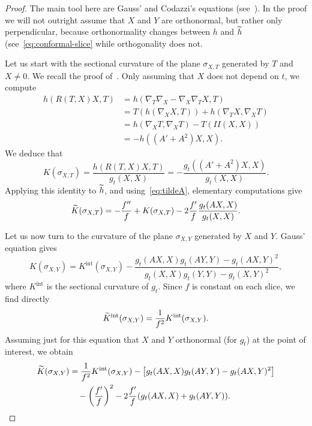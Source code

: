 \documentclass[10pt]{amsart}
\theoremstyle{definition}\newtheorem{defi}[theo]{Definition}\newtheorem{rema}[theo]{Remark}\newtheorem{exam}[theo]{Example}\newtheorem{exem}[theo]{Example}\newtheorem{nota}[theo]{Notation}
\DeclareMathOperator{\intt}{int}
\theoremstyle{plain}
\let\oldtilde\tilde
\renewcommand*{\tilde}[1]{\mathchoice{\widetilde{#1}}{\widetilde{#1}}{\oldtilde{#1}}{\oldtilde{#1}}}
\begin{document}
\begin{proof}
The main tool here are Gauss' and Codazzi's equations (see~\cite[Section~6.3]{DoCarmo}). In the proof we will not outright assume that $X$ and $Y$ are orthonormal, but rather only perpendicular, because orthonormality changes between $h$ and $\tilde{h}$ (see~\eqref{eq:conformal-slice} while orthogonality does not.

Let us start with the sectional curvature of the plane $\sigma_{X,T}$ generated by $T$ and $X\neq 0$. We recall the proof of~\cite[Eq.~2.7]{Chen-Erchenko-Gogolev}. Only assuming that $X$ does not depend on $t$, we compute
\begin{align*}
h(R(T,X)X, T) &= h(\nabla_T \nabla_X-\nabla_X \nabla_T X, T) \\
& = T(h(\nabla_X X,T)) + h(\nabla_T X, \nabla_X T) \\
& = h(\nabla_X T, \nabla_X T) - T(II(X,X)) \\
&= - h((A'+A^2)X,X).
\end{align*}
We deduce that
\[
K(\sigma_{X,T}) = \frac{h(R(T,X)X,T)}{g_t(X,X)}= - \frac{g_t((A'+A^2)X,X)}{g_t(X,X)}.
\]
Applying this identity to $\tilde{h}$, and using~\eqref{eq:tildeA}, elementary computations give
\[
\tilde{K}(\sigma_{X,T}) = - \frac{f''}{f} + K(\sigma_{X,T}) - 2 \frac{f'}{f} \frac{g_t(AX,X)}{g_t(X,X)}.
\]


Let us now turn to the curvature of the plane $\sigma_{X,Y}$ generated by $X$ and $Y$. Gauss' equation gives
\[
K(\sigma_{X,Y}) = K^{\intt}(\sigma_{X,Y}) - \frac{ g_t(AX,X)g_t(AY,Y) - g_t(AX,Y)^2}{g_t(X,X)g_t(Y,Y) - g_t(X,Y)^2},
\]
where $K^{\intt}$ is the sectional curvature of $g_t$. Since $f$ is constant on each slice, we find directly
\[
\tilde{K}^{\intt}(\sigma_{X,Y}) = \frac{1}{f^2} K^{\intt}(\sigma_{X,Y}).
\]
Assuming just for this equation that $X$ and $Y$ orthonormal (for $g_t$) at the point of interest, we obtain
\[
\begin{split}
\tilde{K}(\sigma_{X,Y}) &= \frac{1}{f^2} K^{\intt}(\sigma_{X,Y}) - \left[g_t(AX,X)g_t(AY,Y) - g_t(AX,Y)^2\right] \\
&\quad - \left(\frac{f'}{f}\right)^2 - 2 \frac{f'}{f}(g_t(AX,X) + g_t(AY,Y)).
\end{split}
\]


\end{proof}
\end{document}
